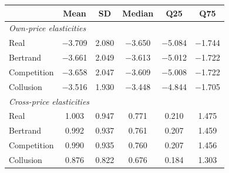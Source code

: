 \begin{tabular}{lccccc}
\toprule
 & Mean & SD & Median & Q25 & Q75 \\
\midrule
\multicolumn{6}{l}{\textit{Own-price elasticities}} \\
Real & $-$3.709 & 2.080 & $-$3.650 & $-$5.084 & $-$1.744 \\
Bertrand & $-$3.661 & 2.049 & $-$3.613 & $-$5.012 & $-$1.722 \\
Competition & $-$3.658 & 2.047 & $-$3.609 & $-$5.008 & $-$1.722 \\
Collusion & $-$3.516 & 1.930 & $-$3.448 & $-$4.844 & $-$1.705 \\
\midrule
\multicolumn{6}{l}{\textit{Cross-price elasticities}} \\
Real & 1.003 & 0.947 & 0.771 & 0.210 & 1.475 \\
Bertrand & 0.992 & 0.937 & 0.761 & 0.207 & 1.459 \\
Competition & 0.990 & 0.935 & 0.760 & 0.207 & 1.456 \\
Collusion & 0.876 & 0.822 & 0.676 & 0.184 & 1.303 \\
\bottomrule
\end{tabular}
